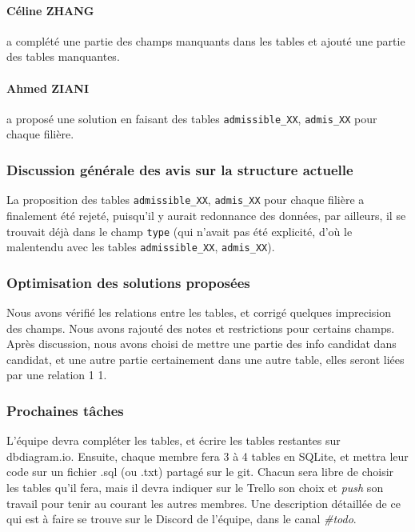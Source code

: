 \paragraph{Céline ZHANG} a complété une partie des champs manquants dans les tables et ajouté une partie des tables manquantes.
\paragraph{Ahmed ZIANI} a proposé une solution en faisant des tables \texttt{admissible\_XX}, \texttt{admis\_XX} pour chaque filière.

\subsubsection*{Discussion générale des avis sur la structure actuelle}
La proposition des tables \texttt{admissible\_XX}, \texttt{admis\_XX} pour chaque filière a finalement été rejeté, puisqu'il y aurait redonnance des données, par ailleurs, il se trouvait déjà dans le champ \texttt{type} (qui n'avait pas été explicité, d'où le malentendu avec les tables \texttt{admissible\_XX}, \texttt{admis\_XX}).

\subsubsection*{Optimisation des solutions proposées}
Nous avons vérifié les relations entre les tables, et corrigé quelques imprecision des champs. Nous avons rajouté des notes et restrictions pour certains champs. Après discussion, nous avons choisi de mettre une partie des info candidat dans candidat, et une autre partie certainement dans une autre table, elles seront liées par une relation 1 1.

\subsubsection*{Prochaines tâches}
L'équipe devra compléter les tables, et écrire les tables restantes sur \textsf{dbdiagram.io}. Ensuite, chaque membre fera 3 à 4 tables en SQLite, et mettra leur code sur un fichier \textsf{.sql} (ou \textsf{.txt}) partagé sur le \textsf{git}. Chacun sera libre de choisir les tables qu'il fera, mais il devra indiquer sur le Trello son choix et \textsl{push} son travail pour tenir au courant les autres membres. Une description détaillée de ce qui est à faire se trouve sur le Discord de l'équipe, dans le canal \textsl{\#todo}.


